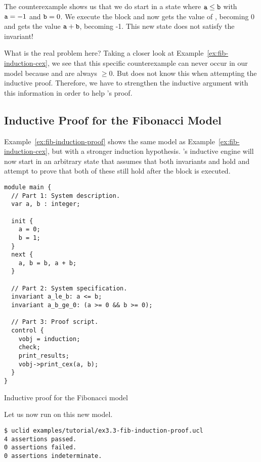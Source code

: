The counterexample shows us that we do start in a state where $\texttt{a} \le \texttt{b}$ with $\texttt{a}=-1$ and $\texttt{b}=0$. We execute the  block and now  gets the value of , becoming 0 and  gets the value $\texttt{a} + \texttt{b}$, becoming -1. This new state does not satisfy the invariant!

What is the real problem here? Taking a closer look at Example~\ref{ex:fib-induction-cex}, we see that this specific counterexample can never occur in our model because  and  are always $\ge 0$. But \uclid{} does not know this when attempting the inductive proof. Therefore, we have to strengthen the inductive argument with this information in order to help \uclid{}'s proof.

\subsection{Inductive Proof for the Fibonacci Model}

Example~\ref{ex:fib-induction-proof} shows the same model as Example~\ref{ex:fib-induction-cex}, but with a stronger induction hypothesis. \uclid{}'s inductive engine will now start in an arbitrary state that assumes that both invariants  and  hold and attempt to prove that both of these still hold after the  block is executed.

\begin{uclidlisting}[htbp]
\begin{lstlisting}[language=uclid,style=uclidstyle]
module main {
  // Part 1: System description.
  var a, b : integer;

  init {
    a = 0;
    b = 1;
  }
  next {
    a, b = b, a + b;
  }

  // Part 2: System specification.
  invariant a_le_b: a <= b;
  invariant a_b_ge_0: (a >= 0 && b >= 0);

  // Part 3: Proof script.
  control {
    vobj = induction;
    check;
    print_results;
    vobj->print_cex(a, b);
  }
}
\end{lstlisting}
\caption{Inductive proof for the Fibonacci model}
\label{ex:fib-induction-proof}
\end{uclidlisting}

Let us now run \uclid{} on this new model.

\begin{Verbatim}[frame=single, samepage=true]
$ uclid examples/tutorial/ex3.3-fib-induction-proof.ucl 
4 assertions passed.
0 assertions failed.
0 assertions indeterminate.
\end{Verbatim}

